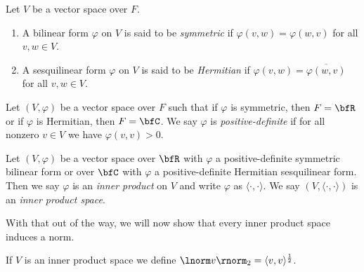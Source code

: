     \begin{definition}
        Let $V$ be a vector space over $F$.
            \begin{enumerate}[label = (\arabic*)]
                \item A bilinear form $\varphi$ on $V$ is said to be \textit{symmetric} if $\varphi(v,w) = \varphi(w,v)$ for all $v,w \in V$.
                \item A sesquilinear form $\varphi$ on $V$ is said to be \textit{Hermitian} if $\varphi(v,w) = \overline{\varphi(w,v)}$ for all $v,w \in V$.
            \end{enumerate}
    \end{definition}

    \begin{definition}
        Let $(V,\varphi)$ be a vector space over $F$ such that if $\varphi$ is symmetric, then $F = \bfR$ or if $\varphi$ is Hermitian, then $F = \bfC$. We say $\varphi$ is \textit{positive-definite} if for all nonzero $v \in V$ we have $\varphi(v,v) > 0$.
    \end{definition}

    \begin{definition}


        Let $(V,\varphi)$ be a vector space over $\bfR$ with $\varphi$ a positive-definite symmetric bilinear form or over $\bfC$ with $\varphi$ a positive-definite Hermitian sesquilinear form. Then we say $\varphi$ is an \textit{inner product} on $V$ and write $\varphi$ as $\langle \cdot,\cdot \rangle$. We say $(V,\langle \cdot,\cdot \rangle)$ is an \textit{inner product space}.
    \end{definition}

    \begin{center}
    \end{center}

    With that out of the way, we will now show that every inner product space induces a norm.

    \begin{definition}
        If $V$ is an inner product space we define $\lnorm v \rnorm_2 = \langle v,v \rangle^\frac{1}{2}$.
    \end{definition}

